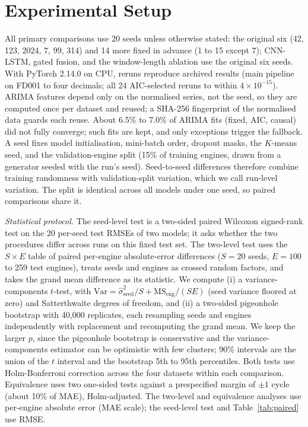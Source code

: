 \documentclass[conference]{IEEEtran}
\begin{document}
\section{Experimental Setup}
All primary comparisons use 20 seeds unless otherwise stated: the original six (42, 123, 2024, 7, 99, 314) and 14 more fixed in advance (1 to 15 except 7); CNN-LSTM, gated fusion, and the window-length ablation use the original six seeds. With PyTorch 2.14.0 on CPU, reruns reproduce archived results (main pipeline on FD001 to four decimals; all 24 AIC-selected reruns to within $4\times10^{-15}$). ARIMA features depend only on the normalised series, not the seed, so they are computed once per dataset and reused; a SHA-256 fingerprint of the normalised data guards each reuse. About 6.5\% to 7.0\% of ARIMA fits (fixed, AIC, causal) did not fully converge; such fits are kept, and only exceptions trigger the fallback. A seed fixes model initialisation, mini-batch order, dropout masks, the $K$-means seed, and the validation-engine split (15\% of training engines, drawn from a generator seeded with the run's seed). Seed-to-seed differences therefore combine training randomness with validation-split variation, which we call run-level variation. The split is identical across all models under one seed, so paired comparisons share it.

\emph{Statistical protocol.} The seed-level test is a two-sided paired Wilcoxon signed-rank test on the 20 per-seed test RMSEs of two models; it asks whether the two procedures differ across runs on this fixed test set. The two-level test uses the $S\times E$ table of paired per-engine absolute-error differences ($S=20$ seeds, $E=100$ to 259 test engines), treats seeds and engines as crossed random factors, and takes the grand mean difference as its statistic. We compute (i) a variance-components $t$-test, with $\mathrm{Var}=\hat\sigma^2_{\text{seed}}/S+\mathrm{MS}_{\text{eng}}/(SE)$ (seed variance floored at zero) and Satterthwaite degrees of freedom, and (ii) a two-sided pigeonhole bootstrap \cite{owen2007} with 40{,}000 replicates, each resampling seeds and engines independently with replacement and recomputing the grand mean. We keep the larger $p$, since the pigeonhole bootstrap is conservative and the variance-components estimator can be optimistic with few clusters; 90\% intervals are the union of the $t$ interval and the bootstrap 5th to 95th percentiles. Both tests use Holm-Bonferroni correction across the four datasets within each comparison. Equivalence uses two one-sided tests against a prespecified margin of $\pm1$ cycle (about 10\% of MAE), Holm-adjusted. The two-level and equivalence analyses use per-engine absolute error (MAE scale); the seed-level test and Table~\ref{tab:paired} use RMSE.
\end{document}
